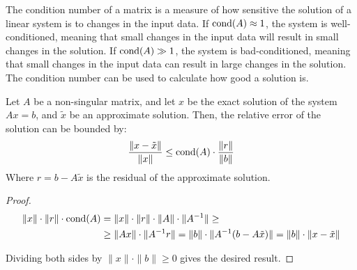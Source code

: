 The condition number of a matrix is a measure of how sensitive the solution of a linear system is to changes in the input data. If $\operatorname{cond}(A)\approx 1$, the system is well-conditioned, meaning that small changes in the input data will result in small changes in the solution. If $\operatorname{cond}(A)\gg 1$, the system is bad-conditioned, meaning that small changes in the input data can result in large changes in the solution. The condition number can be used to calculate how good a solution is.
\begin{prop}
    Let $A$ be a non-singular matrix, and let $x$ be the exact solution of the system $Ax=b$, and $\tilde{x}$ be an approximate solution. Then, the relative error of the solution can be bounded by:
    \begin{equation*}
        \frac{\|x-\tilde{x}\|}{\|x\|} \leq \operatorname{cond}(A) \cdot \frac{\|r\|}{\|b\|}
    \end{equation*}
    Where $r = b - A\tilde{x}$ is the residual of the approximate solution.
    \begin{proof}
        \begin{align*}
            \|x\|\cdot \|r\|\cdot \operatorname{cond}(A) & = \|x\|\cdot \|r\|\cdot \|A\|\cdot \|A^{-1}\| \geq\\&\geq  \|Ax\|\cdot \|A^{-1}r\| = \|b\|\cdot \|A^{-1}(b - A\tilde{x})\| = \|b\|\cdot \|x-\tilde{x}\|
        \end{align*}

        Dividing both sides by $\|x\|\cdot \|b\|\geq 0$ gives the desired result.
    \end{proof}
\end{prop}